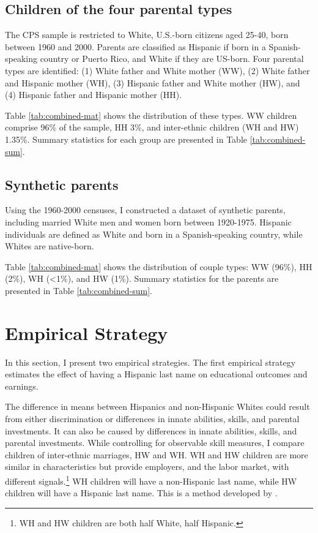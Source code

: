 \documentclass[a4paper,fleqn]{cas-sc}
\begin{document}
\subsection{Children of the four parental types}

The CPS sample is restricted to White, U.S.-born citizens aged 25-40, born between 1960 and 2000. Parents are classified as Hispanic if born in a Spanish-speaking country or Puerto Rico, and White if they are US-born. Four parental types are identified: (1) White father and White mother (WW), (2) White father and Hispanic mother (WH), (3) Hispanic father and White mother (HW), and (4) Hispanic father and Hispanic mother (HH).

Table \ref{tab:combined-mat} shows the distribution of these types. WW children comprise 96\% of the sample, HH 3\%, and inter-ethnic children (WH and HW) 1.35\%. Summary statistics for each group are presented in Table \ref{tab:combined-sum}.

\subsection{Synthetic parents}

Using the 1960-2000 censuses, I constructed a dataset of synthetic parents, including married White men and women born between 1920-1975. Hispanic individuals are defined as White and born in a Spanish-speaking country, while Whites are native-born.

Table \ref{tab:combined-mat} shows the distribution of couple types: WW (96\%), HH (2\%), WH (<1\%), and HW (1\%). Summary statistics for the parents are presented in Table \ref{tab:combined-sum}.

\section{Empirical Strategy}\label{sec:emp_model}

In this section, I present two empirical strategies. The first empirical strategy estimates the effect of having a Hispanic last name on educational outcomes and earnings. 

The difference in means between Hispanics and non-Hispanic Whites could result from either discrimination or differences in innate abilities, skills, and parental investments. It can also be caused by differences in innate abilities, skills, and parental investments. While controlling for observable skill measures, I compare children of inter-ethnic marriages, HW and WH. WH and HW children are more similar in characteristics but provide employers, and the labor market, with different signals.\footnote{WH and HW children are both half White, half Hispanic.} WH children will have a non-Hispanic last name, while HW children will have a Hispanic last name. This is a method developed by \citet{rubinstein2014pride}.
\end{document}
